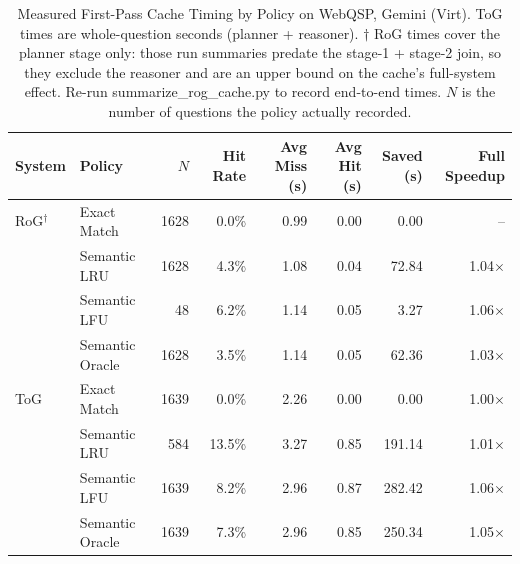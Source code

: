\begin{table}[htbp]
\centering
\caption{Measured First-Pass Cache Timing by Policy on WebQSP, Gemini (Virt). ToG times are whole-question seconds (planner + reasoner). $\dagger$ RoG times cover the planner stage only: those run summaries predate the stage-1 + stage-2 join, so they exclude the reasoner and are an upper bound on the cache's full-system effect. Re-run summarize\_rog\_cache.py to record end-to-end times. $N$ is the number of questions the policy actually recorded.}
\label{tab:live_cache_timing_webqsp_gemini_virt}
\begin{tabular}{llrrrrrr}
\hline
\textbf{System} & \textbf{Policy} & \textbf{$N$} & \textbf{Hit Rate} & \textbf{Avg Miss (s)} & \textbf{Avg Hit (s)} & \textbf{Saved (s)} & \textbf{Full Speedup} \\
\hline
RoG$^{\dagger}$ & Exact Match      & 1628 & 0.0\% & 0.99 & 0.00 & 0.00 & -- \\
     & Semantic LRU     & 1628 & 4.3\% & 1.08 & 0.04 & 72.84 & 1.04$\times$ \\
     & Semantic LFU     & 48 & 6.2\% & 1.14 & 0.05 & 3.27 & 1.06$\times$ \\
     & Semantic Oracle  & 1628 & 3.5\% & 1.14 & 0.05 & 62.36 & 1.03$\times$ \\
\hline
ToG  & Exact Match      & 1639 & 0.0\% & 2.26 & 0.00 & 0.00 & 1.00$\times$ \\
     & Semantic LRU     & 584 & 13.5\% & 3.27 & 0.85 & 191.14 & 1.01$\times$ \\
     & Semantic LFU     & 1639 & 8.2\% & 2.96 & 0.87 & 282.42 & 1.06$\times$ \\
     & Semantic Oracle  & 1639 & 7.3\% & 2.96 & 0.85 & 250.34 & 1.05$\times$ \\
\hline
\end{tabular}
\end{table}

